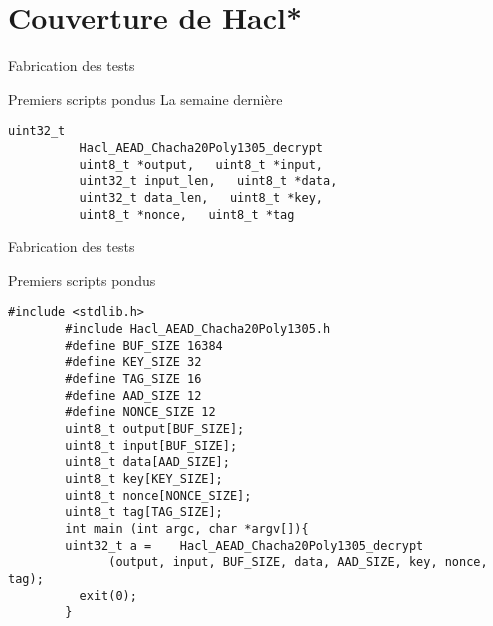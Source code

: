 \documentclass[A4,svgnames,9pt,aspectratio=169]{beamer}
\begin{document}

\section{Couverture de Hacl*}
\frame{\sectionpage}

\begin{frame}[fragile]{Fabrication des tests}
  \begin{block}{Premiers scripts pondus}
    \tiny{La semaine dernière}
      \begin{lstlisting}[style=global, caption={Hacl\_AEAD\_Chacha20Poly1305\_decrypt}, gobble=8, label=lst:lastweek]
        uint32_t
          Hacl_AEAD_Chacha20Poly1305_decrypt
          uint8_t *output,   uint8_t *input,
          uint32_t input_len,   uint8_t *data,
          uint32_t data_len,   uint8_t *key,
          uint8_t *nonce,   uint8_t *tag
      \end{lstlisting}
  \end{block}
\end{frame}

\begin{frame}[fragile]{Fabrication des tests}
  \begin{block}{Premiers scripts pondus}
      \begin{lstlisting}[style=CStyle, caption={Hacl\_AEAD\_Chacha20Poly1305\_decrypt.c}, gobble=8]
        #include <stdlib.h>
        #include Hacl_AEAD_Chacha20Poly1305.h
        #define BUF_SIZE 16384
        #define KEY_SIZE 32
        #define TAG_SIZE 16
        #define AAD_SIZE 12
        #define NONCE_SIZE 12
        uint8_t output[BUF_SIZE];
        uint8_t input[BUF_SIZE];
        uint8_t data[AAD_SIZE];
        uint8_t key[KEY_SIZE];
        uint8_t nonce[NONCE_SIZE];
        uint8_t tag[TAG_SIZE];
        int main (int argc, char *argv[]){
        uint32_t a =    Hacl_AEAD_Chacha20Poly1305_decrypt
              (output, input, BUF_SIZE, data, AAD_SIZE, key, nonce, tag);
          exit(0);
        }
      \end{lstlisting}
  \end{block}
\end{frame}

\end{document}
